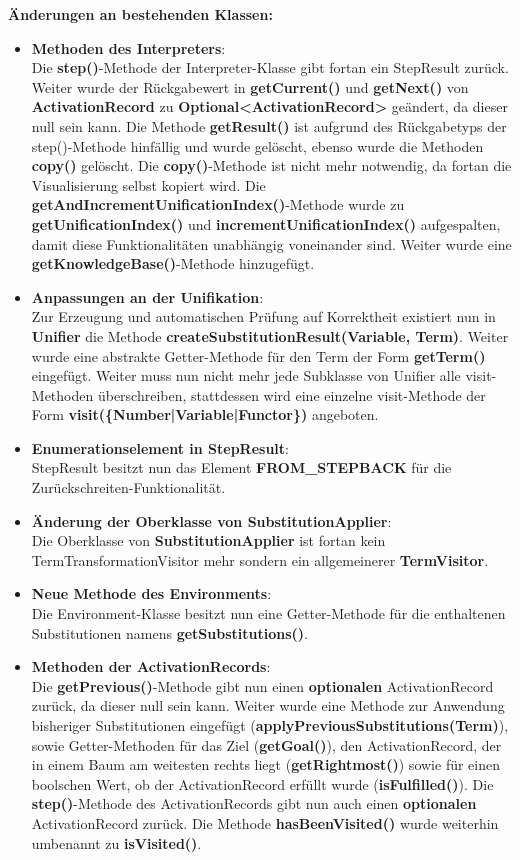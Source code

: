 \documentclass[parskip=full,11pt,twoside]{scrartcl}
\begin{document}
\textbf{Änderungen an bestehenden Klassen:}\\
\begin{itemize}
	\item \textbf{Methoden des Interpreters}:\\
	Die \textbf{step()}-Methode der Interpreter-Klasse gibt fortan ein StepResult zurück. Weiter wurde der Rückgabewert in \textbf{getCurrent()} und \textbf{getNext()} von \textbf{ActivationRecord} zu \textbf{Optional<ActivationRecord>} geändert, da dieser null sein kann. Die Methode \textbf{getResult()} ist aufgrund des Rückgabetyps der step()-Methode hinfällig und wurde gelöscht, ebenso wurde die Methoden \textbf{copy()} gelöscht. Die \textbf{copy()}-Methode ist nicht mehr notwendig, da fortan die Visualisierung selbst kopiert wird. Die \textbf{getAndIncrementUnificationIndex()}-Methode wurde zu \textbf{getUnificationIndex()} und \textbf{incrementUnificationIndex()} aufgespalten, damit diese Funktionalitäten unabhängig voneinander sind. Weiter wurde eine \textbf{getKnowledgeBase()}-Methode hinzugefügt.
	\item \textbf{Anpassungen an der Unifikation}:\\
	Zur Erzeugung und automatischen Prüfung auf Korrektheit existiert nun in \textbf{Unifier} die Methode \textbf{createSubstitutionResult(Variable, Term)}. Weiter wurde eine abstrakte Getter-Methode für den Term der Form \textbf{getTerm()} eingefügt. Weiter muss nun nicht mehr jede Subklasse von Unifier alle visit-Methoden überschreiben, stattdessen wird eine einzelne visit-Methode der Form \textbf{visit(\{Number|Variable|Functor\})} angeboten.
	\item \textbf{Enumerationselement in StepResult}:\\
	StepResult besitzt nun das Element \textbf{FROM\_STEPBACK} für die Zurückschreiten-Funktionalität.
	\item \textbf{Änderung der Oberklasse von SubstitutionApplier}:\\
	Die Oberklasse von \textbf{SubstitutionApplier} ist fortan kein TermTransformationVisitor mehr sondern ein allgemeinerer \textbf{TermVisitor}.
	\item \textbf{Neue Methode des Environments}:\\
	Die Environment-Klasse besitzt nun eine Getter-Methode für die enthaltenen Substitutionen namens \textbf{getSubstitutions()}.
	\item \textbf{Methoden der ActivationRecords}:\\
	Die \textbf{getPrevious()}-Methode gibt nun einen \textbf{optionalen} ActivationRecord zurück, da dieser null sein kann. Weiter wurde eine Methode zur Anwendung bisheriger Substitutionen eingefügt (\textbf{applyPreviousSubstitutions(Term)}), sowie Getter-Methoden für das Ziel (\textbf{getGoal()}), den ActivationRecord, der in einem Baum am weitesten rechts liegt (\textbf{getRightmost()}) sowie für einen boolschen Wert, ob der ActivationRecord erfüllt wurde (\textbf{isFulfilled()}). Die \textbf{step()}-Methode des ActivationRecords gibt nun auch einen \textbf{optionalen} ActivationRecord zurück. Die Methode \textbf{hasBeenVisited()} wurde weiterhin umbenannt zu \textbf{isVisited()}.

\end{itemize}
\end{document}
